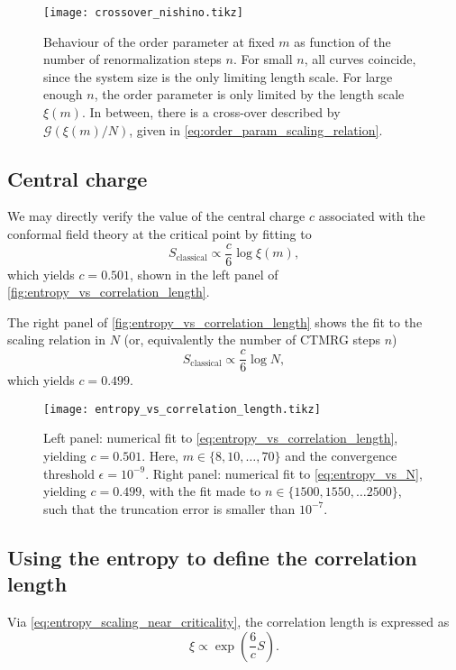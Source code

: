 \begin{figure}
  \texttt{[image: crossover\_nishino.tikz]}
  \caption{Behaviour of the order parameter at fixed $m$ as function of
  the number of renormalization steps $n$. For small $n$, all curves coincide, since the system size is the only
  limiting length scale. For large enough $n$, the order parameter is only limited by the length scale
  $\xi(m)$. In between, there is a cross-over described by $\mathcal{G}(\xi(m)/N)$, given in
  \autoref{eq:order_param_scaling_relation}.}\label{fig:crossover_nishino}
\end{figure}

\subsection{Central charge}
We may directly verify the value of the central charge $c$ associated with the conformal field theory at the critical
point by fitting to
\begin{equation}\label{eq:entropy_vs_correlation_length}
  S_{\text{classical}} \propto \frac{c}{6} \log \xi(m),
\end{equation}
which yields $c = 0.501$, shown in the left panel of \autoref{fig:entropy_vs_correlation_length}.

The right panel of \autoref{fig:entropy_vs_correlation_length} shows the fit to the scaling relation in $N$ (or,
equivalently the number of CTMRG steps $n$)
\begin{equation}\label{eq:entropy_vs_N}
  S_{\text{classical}} \propto \frac{c}{6} \log N,
\end{equation}
which yields $c = 0.499$.

\begin{figure}
  \texttt{[image: entropy\_vs\_correlation\_length.tikz]}

  \caption{Left panel:
numerical fit to \autoref{eq:entropy_vs_correlation_length}, yielding $c = 0.501$.
Here, $m \in \{ 8, 10, \dots, 70 \}$ and the convergence threshold $\epsilon = 10^{-9}$.
Right panel:
numerical fit to \autoref{eq:entropy_vs_N}, yielding $c = 0.499$,
with the fit made to $n \in \{ 1500, 1550, \dots 2500 \}$, such that the truncation error is smaller than
$10^{-7}$.}
\label{fig:entropy_vs_correlation_length}
\end{figure}

\subsection{Using the entropy to define the correlation length}\label{sec:entropy_to_define_correlation_length}
Via \autoref{eq:entropy_scaling_near_criticality}, the correlation length is expressed as
\begin{equation}\label{eq:correlation_length_as_function_of_entropy}
  \xi \propto \exp(\frac{6}{c}S).
\end{equation}

